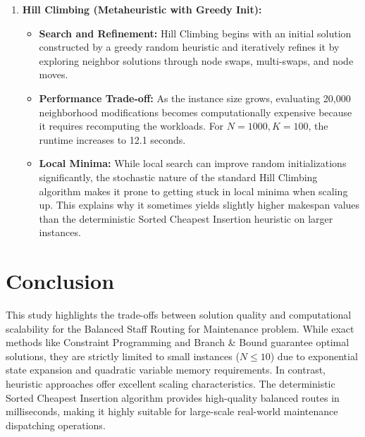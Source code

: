 \documentclass[11pt]{article}
\begin{document}
\begin{enumerate}
    \item \textbf{Hill Climbing (Metaheuristic with Greedy Init):}
    \begin{itemize}
        \item \textbf{Search and Refinement:} Hill Climbing begins with an initial solution constructed by a greedy random heuristic and iteratively refines it by exploring neighbor solutions through node swaps, multi-swaps, and node moves.
        \item \textbf{Performance Trade-off:} As the instance size grows, evaluating 20,000 neighborhood modifications becomes computationally expensive because it requires recomputing the workloads. For $N=1000, K=100$, the runtime increases to 12.1 seconds.
        \item \textbf{Local Minima:} While local search can improve random initializations significantly, the stochastic nature of the standard Hill Climbing algorithm makes it prone to getting stuck in local minima when scaling up. This explains why it sometimes yields slightly higher makespan values than the deterministic Sorted Cheapest Insertion heuristic on larger instances.
    \end{itemize}
\end{enumerate}

\section{Conclusion}
This study highlights the trade-offs between solution quality and computational scalability for the Balanced Staff Routing for Maintenance problem. While exact methods like Constraint Programming and Branch \& Bound guarantee optimal solutions, they are strictly limited to small instances ($N \le 10$) due to exponential state expansion and quadratic variable memory requirements. In contrast, heuristic approaches offer excellent scaling characteristics. The deterministic Sorted Cheapest Insertion algorithm provides high-quality balanced routes in milliseconds, making it highly suitable for large-scale real-world maintenance dispatching operations.
\end{document}
